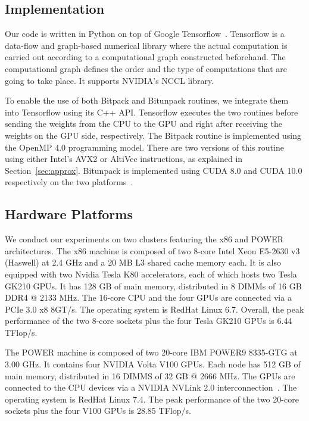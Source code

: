 \subsection{Implementation}
Our code is written in Python on top of Google Tensorflow~\cite{tensorflow}.
Tensorflow is a data-flow and graph-based numerical library where 
the actual computation is carried out according to a computational graph 
constructed beforehand.
The computational graph defines the order and the type of computations that are 
going to take place. It supports NVIDIA's NCCL library.

To enable the use of both Bitpack and Bitunpack routines, we integrate them into Tensorflow using its C++ API.
Tensorflow executes the two routines before sending 
the weights from the CPU to the GPU and right after receiving the weights on the 
GPU side, respectively.
The Bitpack routine is implemented using the OpenMP 4.0 programming model. 
There are two versions of this routine using either Intel's AVX2 or AltiVec instructions, as explained in Section~\ref{sec:approx}.
Bitunpack is implemented using CUDA 8.0 and CUDA 10.0 respectively on the two 
platforms~\cite{cuda}.

\subsection{Hardware Platforms}
\label{sec:platform}
We conduct our experiments on two clusters featuring the x86 and POWER architectures.
The x86 machine is composed of two 8-core Intel Xeon
\textregistered E5-2630 v3 (Haswell) at 2.4 GHz and a 20 MB L3 shared cache memory each. 
It is also equipped with two Nvidia Tesla K80 accelerators, each of which hosts two 
Tesla GK210 GPUs.
It has 128 GB of main memory, distributed in 8 DIMMs of 16 GB DDR4 @ 2133 MHz.
The 16-core CPU and the four GPUs are connected via a PCIe 3.0 x8 8GT/s.
The operating system is RedHat Linux 6.7.
Overall, the peak performance of the two 8-core sockets plus the four Tesla GK210 GPUs is 6.44 TFlop/s.

The POWER machine is composed of two 20-core IBM POWER9 8335-GTG at 3.00 GHz.  
It contains four NVIDIA Volta V100 GPUs. 
Each node has 512 GB of main memory, distributed in 16 DIMMS of 32 GB @ 2666 MHz.
The GPUs are connected to the CPU devices via a NVIDIA NVLink 2.0 interconnection~\cite{nvlink}.
The operating system is RedHat Linux 7.4.
The peak performance of the two 20-core sockets plus the four V100 GPUs is 28.85 TFlop/s.

